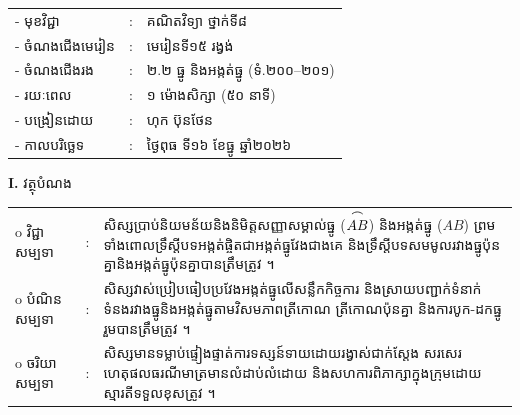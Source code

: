 \documentclass[a4paper,10pt]{article}
\newcommand{\wcirc}{{\CourierBullet\fontsize{9.5pt}{11pt}\selectfont o}}
\newcommand{\arc}[1]{\ensuremath{\overset{\tikz[baseline=-0.55ex]\draw[black, line width=0.55pt] (0,0) to[bend left=40] (1.8ex,0);}{#1}}}
\begin{document}
{\renewcommand{\arraystretch}{0.95}
\hspace*{4.05cm}%
\begin{tabular}{@{}l l l@{}}
  - \hspace{0.35cm} មុខវិជ្ជា & : & គណិតវិទ្យា ថ្នាក់ទី៨ \\
  - \hspace{0.35cm} ចំណងជើងមេរៀន & : & មេរៀនទី១៥ រង្វង់ \\
  - \hspace{0.35cm} ចំណងជើងរង & : & ២.២ ធ្នូ និងអង្កត់ធ្នូ (ទំ.២០០--២០១) \\
  - \hspace{0.35cm} រយៈពេល & : & ១ ម៉ោងសិក្សា (៥០ នាទី) \\
  - \hspace{0.35cm} បង្រៀនដោយ & : & ហុក ប៊ុនថែន \\
  - \hspace{0.35cm} កាលបរិច្ឆេទ & : & ថ្ងៃពុធ ទី១៦ ខែធ្នូ ឆ្នាំ២០២៦ \\
\end{tabular}

\vspace{1pt}

\textbf{I.} {\muol វត្ថុបំណង}\\[1pt]
\hspace*{0.55cm}%
\begin{tabular}{@{}l l L{14.2cm}@{}}
  \wcirc \hspace{0.25cm} វិជ្ជាសម្បទា & : & សិស្សប្រាប់និយមន័យនិងនិមិត្តសញ្ញាសម្គាល់ធ្នូ ($\arc{AB}$) និងអង្កត់ធ្នូ ($AB$) ព្រមទាំងពោលទ្រឹស្ដីបទអង្កត់ផ្ចិតជាអង្កត់ធ្នូវែងជាងគេ និងទ្រឹស្ដីបទសមមូលរវាងធ្នូប៉ុនគ្នានិងអង្កត់ធ្នូប៉ុនគ្នាបានត្រឹមត្រូវ ។ \\
  \wcirc \hspace{0.25cm} បំណិនសម្បទា & : & សិស្សវាស់ប្រៀបធៀបប្រវែងអង្កត់ធ្នូលើសន្លឹកកិច្ចការ និងស្រាយបញ្ជាក់ទំនាក់ទំនងរវាងធ្នូនិងអង្កត់ធ្នូតាមវិសមភាពត្រីកោណ ត្រីកោណប៉ុនគ្នា និងការបូក-ដកធ្នូរួមបានត្រឹមត្រូវ ។ \\
  \wcirc \hspace{0.25cm} ចរិយាសម្បទា & : & សិស្សមានទម្លាប់ផ្ទៀងផ្ទាត់ការទស្សន៍ទាយដោយរង្វាស់ជាក់ស្ដែង សរសេរហេតុផលធរណីមាត្រមានលំដាប់លំដោយ និងសហការពិភាក្សាក្នុងក្រុមដោយស្មារតីទទួលខុសត្រូវ ។ \\
\end{tabular}

\vspace{1pt}

}
\end{document}
